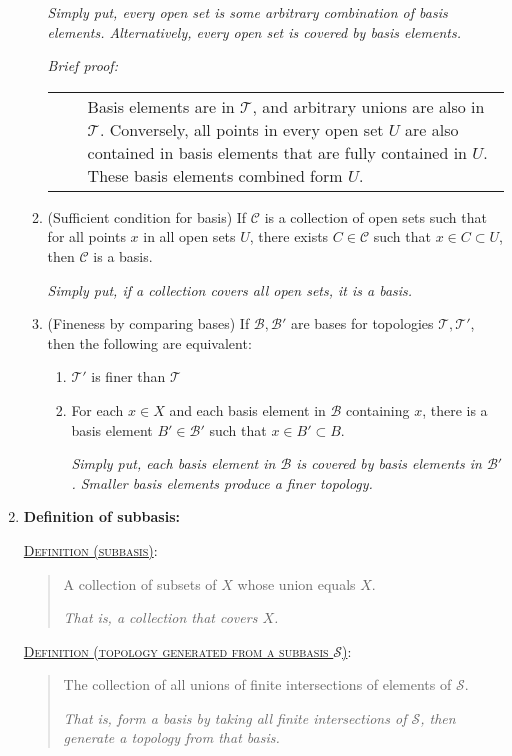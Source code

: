 \documentclass[letterpaper, 12pt]{article}
\newcommand{\ms}[1]{\mathscr{#1}}
\newcommand{\defn}[2]{\textsc{\underline{Definition (#1)}:}\begin{quote} #2\end{quote}}
\newenvironment{briefproof}{\footnotesize\begin{flushleft}\textit{Brief proof:}\par\begin{tabular}{l|p{0.8\textwidth}}$\quad$&}{\\
    \end{tabular}\end{flushleft}}
\begin{document}
\begin{enumerate}[resume]
\begin{enumerate}
                \textit{Simply put, every open set is some arbitrary combination of basis elements. Alternatively, every open set is covered by basis elements.}
                \begin{briefproof}
                Basis elements are in $\ms{T}$, and arbitrary unions are also in $\ms{T}$. Conversely, all points in every open set $U$ are also contained in basis elements that are fully contained in $U$. These basis elements combined form $U$.
                \end{briefproof}

                \item (Sufficient condition for basis) If $\ms{C}$ is a collection of open sets such that for all points $x$ in all open sets $U$, there exists $C\in\ms{C}$ such that $x\in C\subset U$, then $\ms{C}$ is a basis.

                \textit{Simply put, if a collection covers all open sets, it is a basis.}

                \item (Fineness by comparing bases) If $\ms{B}, \ms{B'}$ are bases for topologies $\ms{T}, \ms{T'}$, then the following are equivalent:
                \begin{enumerate}
                    \item $\ms{T'}$ is finer than $\ms{T}$
                    \item For each $x\in X$ and each basis element in $\ms{B}$ containing $x$, there is a basis element $B'\in\ms{B'}$ such that $x\in B' \subset B$.

                    \textit{Simply put, each basis element in $\ms{B}$ is covered by basis elements in $\ms{B'}$. Smaller basis elements produce a finer topology.}
                \end{enumerate}
            \end{enumerate}
        \item \textbf{Definition of subbasis:}

            \defn{subbasis}{A collection of subsets of $X$ whose union equals $X$.\par\textit{That is, a collection that covers $X$.}}
            \defn{topology generated from a subbasis $\ms{S}$}{The collection of all unions of finite intersections of elements of $\ms{S}$.\par\textit{That is, form a basis by taking all finite intersections of $\ms{S}$, then generate a topology from that basis.}}
        \end{enumerate}
\end{document}
